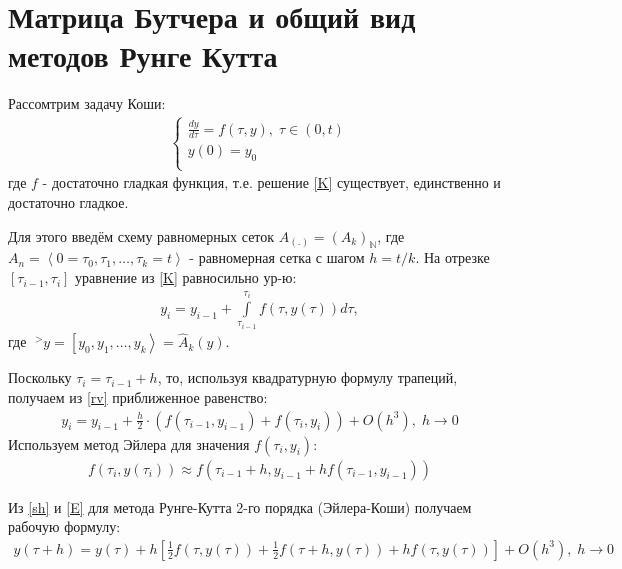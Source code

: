 \documentclass[__main__.tex]{subfiles}
\begin{document}
\section{Матрица Бутчера и общий вид методов Рунге Кутта}

Рассомтрим задачу Коши:
\begin{gather}
	\begin{cases}
		\frac{dy}{d\tau}=f(\tau,y),\; \tau\in(0,t)\\
		y(0)=y_0\\
	\end{cases}
	\label{K}
\end{gather}
где $f$ - достаточно гладкая функция, т.е. решение \ref{K} существует, единственно и достаточно гладкое.

Для этого введём схему равномерных сеток $A_{({.})} = (A_{k})_{\mathbb{N}}$, где $A_n=\left< 0=\tau_0,\tau_1,\dots,\tau_k=t \right>$ - равномерная сетка с шагом $h=t/k$. На отрезке $[\tau_{i-1},\tau_i]$ уравнение из \ref{K} равносильно ур-ю:
\begin{gather}
	y_i=y_{i-1}+\int\limits_{\tau_{i-1}}^{\tau_i}f(\tau,y(\tau))d\tau,
	\label{rv}
\end{gather}
где $\;^>y=\left[y_0,y_1,\dots,y_k\right> = \hat A_k(y)$.

Поскольку $\tau_i=\tau_{i-1}+h$, то, используя квадратурную формулу трапеций, получаем из \ref{rv} приближенное равенство:
\begin{gather}
	y_i=y_{i-1}+\frac{h}{2}\cdot\left(f(\tau_{i-1},y_{i-1})+f(\tau_{i},y_{i})\right)+O(h^3),\; h\rightarrow0
	\label{sh}
\end{gather}
Используем метод Эйлера для значения $f(\tau_i,y_i)$:
\begin{gather}
	f(\tau_i,y(\tau_i))\approx f(\tau_{i-1}+h,y_{i-1}+hf(\tau_{i-1},y_{i-1}))
	\label{E}
\end{gather}

Из \ref{sh} и \ref{E} для метода Рунге-Кутта 2-го порядка (Эйлера-Коши) получаем рабочую формулу:
\begin{gather}
	y(\tau+h)=y(\tau)+h\left[\frac{1}{2}f(\tau,y(\tau))+\frac{1}{2}f(\tau+h,y(\tau))+hf(\tau,y(\tau))\right]+O(h^3),\; h\rightarrow0
	\label{rk}
\end{gather}
\end{document}
